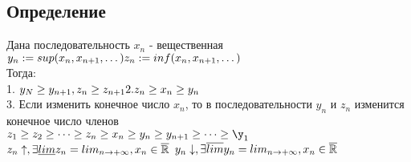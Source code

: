 \documentclass[12pt, a4paper]{article}
\newcommand{\nl}{\newline}
\begin{document}
\subsection{Определение}
Дана последовательность $ x_n $ - вещественная \nl
$ y_n:= sup(x_n,x_{n+1},\dots) \\
z_n:= inf(x_n,x_{n+1},\dots) $\\
Тогда: \\
1. $ y_N \geq y_{n+1} , z_n \geq z_{n+1} \\
2. z_n \geq x_n \geq y_n $\\
3. Если изменить конечное число $ x_n $, то в последовательности $ y_n $ и $ z_n $ изменится конечное число членов\nl \\
$z_1 \geq z_2 \geq \dots \geq z_n \geq x_n \geq y_n \geq y_{n+1} \geq \dots \geq \y_1$ \\
$ z_n\uparrow, \exists \underline{lim} z_n = lim_{n\rightarrow+\infty} , x_n \in \overline{\mathbb{R}} \\$
$ y_n\downarrow, \exists \overline{lim} y_n = lim_{n\rightarrow+\infty} , x_n \in \overline{\mathbb{R}} \\$
\end{document}
